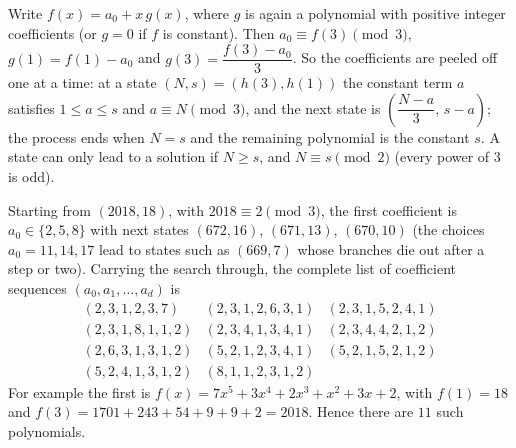 Write $f(x)=a_0+x\,g(x)$, where $g$ is again a polynomial with positive integer coefficients (or $g=0$ if $f$ is constant). Then $a_0\equiv f(3)\pmod3$, $g(1)=f(1)-a_0$ and $g(3)=\dfrac{f(3)-a_0}{3}$. So the coefficients are peeled off one at a time: at a state $(N,s)=(h(3),h(1))$ the constant term $a$ satisfies $1\le a\le s$ and $a\equiv N\pmod3$, and the next state is $\left(\dfrac{N-a}{3},\,s-a\right)$; the process ends when $N=s$ and the remaining polynomial is the constant $s$. A state can only lead to a solution if $N\ge s$, and $N\equiv s\pmod2$ (every power of $3$ is odd).

Starting from $(2018,18)$, with $2018\equiv2\pmod3$, the first coefficient is $a_0\in\{2,5,8\}$ with next states $(672,16)$, $(671,13)$, $(670,10)$ (the choices $a_0=11,14,17$ lead to states such as $(669,7)$ whose branches die out after a step or two). Carrying the search through, the complete list of coefficient sequences $(a_0,a_1,\dots,a_d)$ is
\[
\begin{array}{lll}
(2,3,1,2,3,7) & (2,3,1,2,6,3,1) & (2,3,1,5,2,4,1)\\
(2,3,1,8,1,1,2) & (2,3,4,1,3,4,1) & (2,3,4,4,2,1,2)\\
(2,6,3,1,3,1,2) & (5,2,1,2,3,4,1) & (5,2,1,5,2,1,2)\\
(5,2,4,1,3,1,2) & (8,1,1,2,3,1,2) &
\end{array}
\]
For example the first is $f(x)=7x^5+3x^4+2x^3+x^2+3x+2$, with $f(1)=18$ and $f(3)=1701+243+54+9+9+2=2018$. Hence there are $\boxed{11}$ such polynomials.
